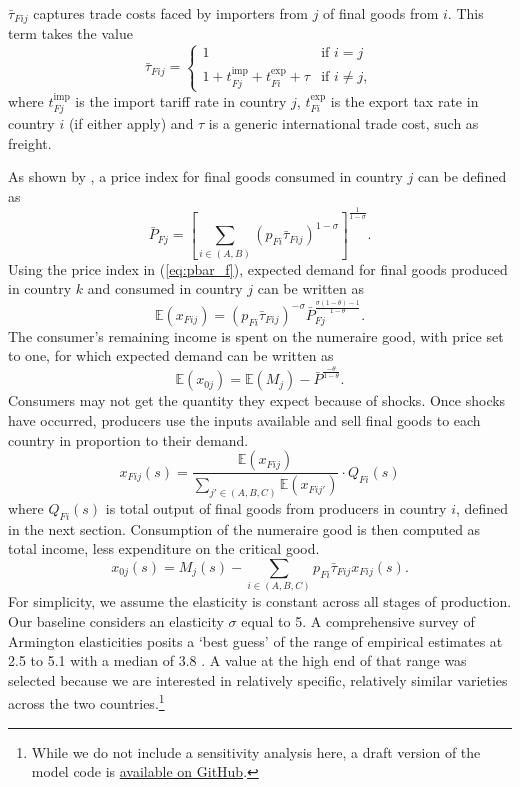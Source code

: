 \documentclass{article}
\begin{document}
$\bar{\tau}_{Fij}$ captures trade costs faced by importers from $j$ of final goods from $i$. This term takes the value 
\begin{equation} \label{eq:tau}
    \bar{\tau}_{Fij} =
    \begin{cases}
        1 &\text{if } i = j \\
        1 + t^{\text{imp}}_{Fj} + t^{\text{exp}}_{Fi} + \tau &\text{if } i \neq j,
    \end{cases}
\end{equation}
where $t^{\text{imp}}_{Fj}$ is the import tariff rate in country $j$, $t^{\text{exp}}_{Fi}$ is the export tax rate in country $i$ (if either apply) and $\tau$ is a generic international trade cost, such as freight.

As shown by \textcite{dixit_monopolistic_1977}, a price index for final goods consumed in country $j$ can be defined as
\begin{equation} \label{eq:pbar_f}
      \bar{P}_{Fj} = \left[ \sum_{i\in(A,B)} (p_{Fi} \bar{\tau}_{Fij} )^{1-\sigma} \right]^\frac{1}{1-\sigma} .
\end{equation}
Using the price index in (\ref{eq:pbar_f}), expected demand for final goods produced in country $k$ and consumed in country $j$ can be written as
\begin{equation*}
    \mathbb{E}(x_{Fij}) = \left( p_{Fi} \bar{\tau}_{Fij} \right)^{-\sigma} \bar{P}_{Fj}^{\frac{\sigma(1 - \theta) - 1}{1 - \theta}} .
\end{equation*}
The consumer's remaining income is spent on the numeraire good, with price set to one, for which expected demand can be written as
\begin{equation*}
    \mathbb{E}(x_{0j}) = \mathbb{E}(M_j) - \bar{P}^\frac{-\theta}{1 - \theta} .
\end{equation*}
Consumers may not get the quantity they expect because of shocks. Once shocks have occurred, producers use the inputs available and sell final goods to each country in proportion to their demand.
\begin{equation*}
    x_{Fij}(s) = \frac{\mathbb{E}(x_{Fij})}{\sum_{j'\in(A,B,C)} \mathbb{E}(x_{Fij'})} \cdot Q_{Fi}(s)
\end{equation*}
where $Q_{Fi}(s)$ is total output of final goods from producers in country $i$, defined in the next section. Consumption of the numeraire good is then computed as total income, less expenditure on the critical good.
\begin{equation*}
    x_{0j}(s) = M_j(s) - \sum_{i\in(A,B,C)} p_{Fi} \bar{\tau}_{Fij} x_{Fij}(s).
\end{equation*}
For simplicity, we assume the elasticity is constant across all stages of production. Our baseline considers an elasticity $\sigma$ equal to 5. A comprehensive survey of Armington elasticities posits a `best guess' of the range of empirical estimates at 2.5 to 5.1 with a median of 3.8 \parencite{bajzik_estimating_2020}. A value at the high end of that range was selected because we are interested in relatively specific, relatively similar varieties across the two countries.\footnote{While we do not include a sensitivity analysis here, a draft version of the model code is \href{https://github.com/sjhardwick/supply_chains}{available on GitHub}.}
\end{document}
